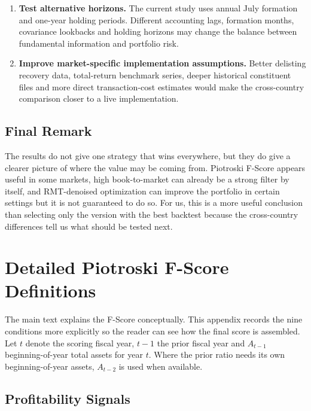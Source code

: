 \documentclass[11pt,a4paper]{report}
\numberwithin{figure}{chapter}
\numberwithin{table}{chapter}
\numberwithin{equation}{chapter}
\begin{document}
\begin{enumerate}
    \item \textbf{Test alternative horizons.} The current study uses annual July formation and one-year holding periods. Different accounting lags, formation months, covariance lookbacks and holding horizons may change the balance between fundamental information and portfolio risk.

    \item \textbf{Improve market-specific implementation assumptions.} Better delisting recovery data, total-return benchmark series, deeper historical constituent files and more direct transaction-cost estimates would make the cross-country comparison closer to a live implementation.
\end{enumerate}

\section{Final Remark}

The results do not give one strategy that wins everywhere, but they do give a clearer picture of where the value may be coming from. Piotroski F-Score appears useful in some markets, high book-to-market can already be a strong filter by itself, and RMT-denoised optimization can improve the portfolio in certain settings but it is not guaranteed to do so. For us, this is a more useful conclusion than selecting only the version with the best backtest because the cross-country differences tell us what should be tested next.

\appendix

\chapter{Detailed Piotroski F-Score Definitions}
\label{app:fscore}

The main text explains the F-Score conceptually. This appendix records the nine conditions more explicitly so the reader can see how the final score is assembled. Let $t$ denote the scoring fiscal year, $t-1$ the prior fiscal year and $A_{t-1}$ beginning-of-year total assets for year $t$. Where the prior ratio needs its own beginning-of-year assets, $A_{t-2}$ is used when available.

\section{Profitability Signals}
\end{document}
